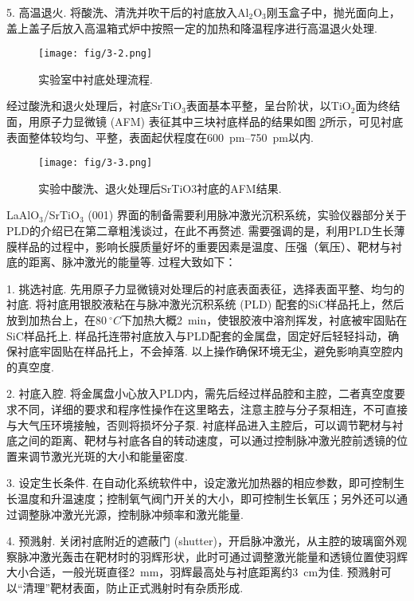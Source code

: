 \documentclass[12pt,a4paper,openany,twoside,UTF-8]{book}
\begin{document}
5. 高温退火. 将酸洗、清洗并吹干后的衬底放入Al$_2$O$_3$刚玉盒子中，抛光面向上，盖上盖子后放入高温箱式炉中按照一定的加热和降温程序进行高温退火处理.

\begin{figure}[htbp]
\centering
\texttt{[image: fig/3-2.png]}
\caption{实验室中衬底处理流程.}
\label{fig:3-2} 
\end{figure}

经过酸洗和退火处理后，衬底SrTiO$_3$表面基本平整，呈台阶状，以TiO$_2$面为终结面，用原子力显微镜 (AFM) 表征其中三块衬底样品的结果如图 \ref{fig:3-3}所示，可见衬底表面整体较均匀、平整，表面起伏程度在\SI{600}{pm}–\SI{750}{pm}以内.

\begin{figure}[htbp]
\centering
\texttt{[image: fig/3-3.png]}
\caption{实验中酸洗、退火处理后SrTiO3衬底的AFM结果.}
\label{fig:3-3} 
\end{figure}

LaAlO$_3$/SrTiO$_3$ (001) 界面的制备需要利用脉冲激光沉积系统，实验仪器部分关于PLD的介绍已在第二章粗浅谈过，在此不再赘述. 需要强调的是，利用PLD生长薄膜样品的过程中，影响长膜质量好坏的重要因素是温度、压强（氧压）、靶材与衬底的距离、脉冲激光的能量等. 过程大致如下：

1. 挑选衬底. 先用原子力显微镜对处理后的衬底表面表征，选择表面平整、均匀的衬底. 将衬底用银胶液粘在与脉冲激光沉积系统 (PLD) 配套的SiC样品托上，然后放到加热台上，在$\SI{80}{^\circ C}$下加热大概\SI{2}{min}，使银胶液中溶剂挥发，衬底被牢固贴在SiC样品托上. 样品托连带衬底放入与PLD配套的金属盘，固定好后轻轻抖动，确保衬底牢固贴在样品托上，不会掉落. 以上操作确保环境无尘，避免影响真空腔内的真空度.

2. 衬底入腔. 将金属盘小心放入PLD内，需先后经过样品腔和主腔，二者真空度要求不同，详细的要求和程序性操作在这里略去，注意主腔与分子泵相连，不可直接与大气压环境接触，否则将损坏分子泵. 衬底样品进入主腔后，可以调节靶材与衬底之间的距离、靶材与衬底各自的转动速度，可以通过控制脉冲激光腔前透镜的位置来调节激光光斑的大小和能量密度.

3. 设定生长条件. 在自动化系统软件中，设定激光加热器的相应参数，即可控制生长温度和升温速度；控制氧气阀门开关的大小，即可控制生长氧压；另外还可以通过调整脉冲激光光源，控制脉冲频率和激光能量.

4. 预溅射. 关闭衬底附近的遮蔽门 (shutter)，开启脉冲激光，从主腔的玻璃窗外观察脉冲激光轰击在靶材时的羽辉形状，此时可通过调整激光能量和透镜位置使羽辉大小合适，一般光斑直径\SI{2}{mm}，羽辉最高处与衬底距离约\SI{3}{cm}为佳. 预溅射可以“清理”靶材表面，防止正式溅射时有杂质形成.
\end{document}
